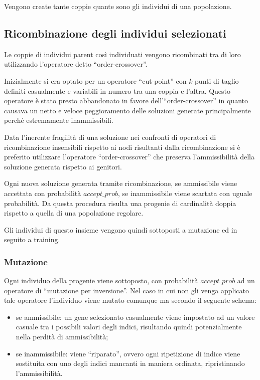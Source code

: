 \documentclass[12pt,a4paper]{article}
\begin{document}
            Vengono create tante coppie quante sono gli individui di una popolazione.
        
        \subsection{Ricombinazione degli individui selezionati}
            Le coppie di individui parent cos\`i individuati vengono ricombinati tra di loro utilizzando l'operatore detto
            ``order-crossover''.

            Inizialmente si era optato per un operatore ``cut-point'' con $k$ punti di taglio definiti casualmente e variabili
            in numero tra una coppia e l'altra.
            Questo operatore \`e stato presto abbandonato in favore dell'``order-crossover'' in quanto causava un netto e veloce
            peggioramento delle soluzioni generate principalmente perch\'e estremamente inammissibili.

            Data l'inerente fragilit\`a di una soluzione nei confronti di operatori di ricombinazione insensibili rispetto ai nodi
            risultanti dalla ricombinazione si \`e preferito utilizzare l'operatore ``order-crossover'' che preserva l'ammissibilit\`a
            della soluzione generata rispetto ai genitori.

            Ogni nuova soluzione generata tramite ricombinazione, se ammissibile viene accettata con probabilit\`a $accept\_prob$,
            se inammissibile viene scartata con uguale probabilit\`a.
            Da questa procedura risulta una progenie di cardinalit\`a doppia rispetto a quella di una popolazione regolare.

            Gli individui di questo insieme vengono quindi sottoposti a mutazione ed in seguito a training.

            \subsubsection{Mutazione}
                Ogni individuo della progenie viene sottoposto, con probabilit\`a $accept\_prob$ ad un operatore di ``mutazione per inversione''.
                Nel caso in cui non gli venga applicato tale operatore l'individuo viene mutato comunque ma secondo il seguente schema:
                \begin{itemize}
                    \item se ammissibile: un gene selezionato casualmente viene impostato ad un valore casuale tra i possibili valori degli indici,
                        risultando quindi potenzialmente nella perdit\`a di ammissibilit\`a;
                    \item se inammissibile: viene ``riparato'', ovvero ogni ripetizione di indice viene sostituita con uno degli indici mancanti in maniera ordinata,
                        ripristinando l'ammissibilit\`a.
                \end{itemize}
\end{document}
